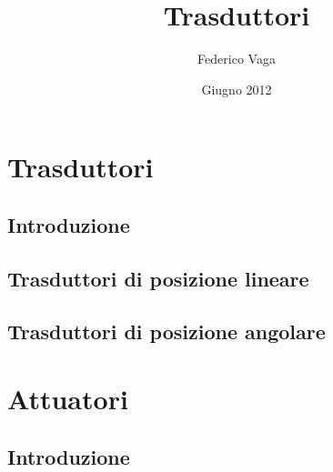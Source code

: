 \documentclass[a4paper,10pt]{book}
\title{Trasduttori}
\author{Federico Vaga}
\date{Giugno 2012}
\begin{document}


\tableofcontents
\listoffigures

\part{Trasduttori}
\chapter{Introduzione}

\chapter{Trasduttori di posizione lineare}

\chapter{Trasduttori di posizione angolare}



\part{Attuatori}
\chapter{Introduzione}

\end{document}
